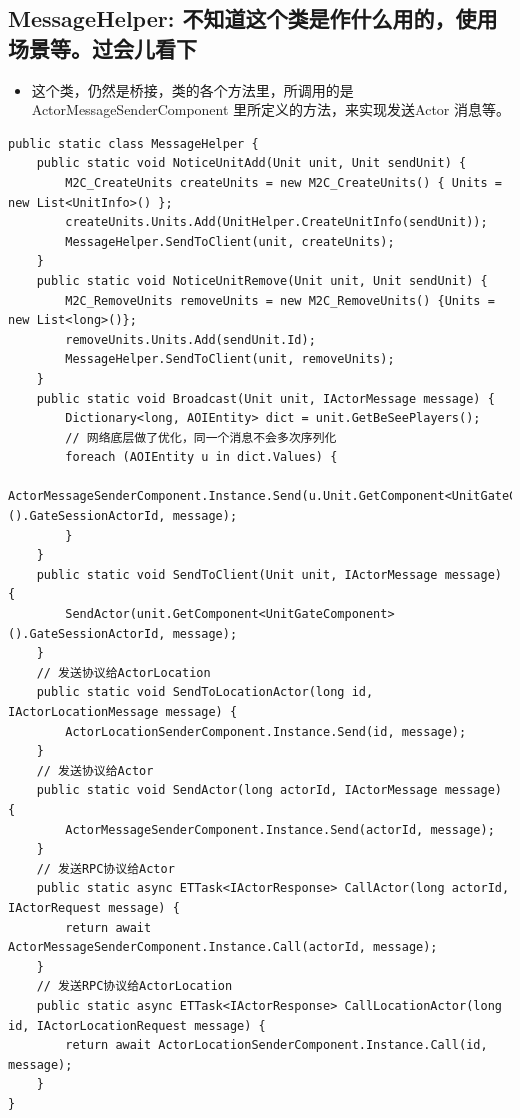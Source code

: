 \documentclass[9pt, b5paper]{article}
\begin{document}
\subsection{MessageHelper: 不知道这个类是作什么用的，使用场景等。过会儿看下}
\label{sec-3-18}
\begin{itemize}
\item 这个类，仍然是桥接，类的各个方法里，所调用的是ActorMessageSenderComponent 里所定义的方法，来实现发送Actor 消息等。
\end{itemize}
\begin{verbatim}
public static class MessageHelper {
    public static void NoticeUnitAdd(Unit unit, Unit sendUnit) {
        M2C_CreateUnits createUnits = new M2C_CreateUnits() { Units = new List<UnitInfo>() };
        createUnits.Units.Add(UnitHelper.CreateUnitInfo(sendUnit));
        MessageHelper.SendToClient(unit, createUnits);
    }
    public static void NoticeUnitRemove(Unit unit, Unit sendUnit) {
        M2C_RemoveUnits removeUnits = new M2C_RemoveUnits() {Units = new List<long>()};
        removeUnits.Units.Add(sendUnit.Id);
        MessageHelper.SendToClient(unit, removeUnits);
    }
    public static void Broadcast(Unit unit, IActorMessage message) {
        Dictionary<long, AOIEntity> dict = unit.GetBeSeePlayers();
        // 网络底层做了优化，同一个消息不会多次序列化
        foreach (AOIEntity u in dict.Values) {
            ActorMessageSenderComponent.Instance.Send(u.Unit.GetComponent<UnitGateComponent>().GateSessionActorId, message);
        }
    }
    public static void SendToClient(Unit unit, IActorMessage message) {
        SendActor(unit.GetComponent<UnitGateComponent>().GateSessionActorId, message);
    }
    // 发送协议给ActorLocation
    public static void SendToLocationActor(long id, IActorLocationMessage message) {
        ActorLocationSenderComponent.Instance.Send(id, message);
    }
    // 发送协议给Actor
    public static void SendActor(long actorId, IActorMessage message) {
        ActorMessageSenderComponent.Instance.Send(actorId, message);
    }
    // 发送RPC协议给Actor
    public static async ETTask<IActorResponse> CallActor(long actorId, IActorRequest message) {
        return await ActorMessageSenderComponent.Instance.Call(actorId, message);
    }
    // 发送RPC协议给ActorLocation
    public static async ETTask<IActorResponse> CallLocationActor(long id, IActorLocationRequest message) {
        return await ActorLocationSenderComponent.Instance.Call(id, message);
    }
}
\end{verbatim}
\end{document}
